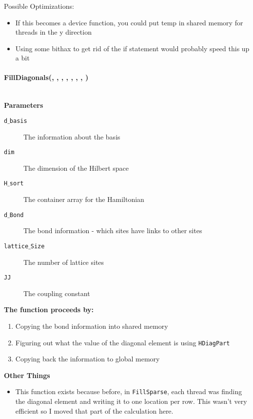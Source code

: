 \documentclass{article}
\begin{document}
Possible Optimizations:
\begin{itemize}
\item{If this becomes a device function, you could put temp in shared memory for threads in the y direction}
\item{Using some bithax to get rid of the if statement would probably speed this up a bit}
\end{itemize}

\paragraph{\cudaglobal \void FillDiagonals(\ptrint , \int , \ptrint , \ptrint , \hamstruct , \ptrint , \int , \double) \\ \\}
\noindent\textbf{Parameters}
\begin{description}
\item[\ptrint \texttt{d$\_$basis}] The information about the basis
\item[\int \texttt{dim}] The dimension of the Hilbert space
\item[\hamstruct \texttt{H$\_$sort}] The container array for the Hamiltonian
\item[\ptrint \texttt{d$\_$Bond}] The bond information - which sites have links to other sites
\item[\int \texttt{lattice$\_$Size}] The number of lattice sites
\item[\double \texttt{JJ}] The coupling constant
\end{description}

\textbf{The function proceeds by:}
\begin{enumerate}
\item{Copying the bond information into shared memory}
\item{Figuring out what the value of the diagonal element is using \texttt{HDiagPart}}
\item{Copying back the information to global memory}
\end{enumerate}

\textbf{Other Things}
\begin{itemize}
\item{This function exists because before, in \texttt{FillSparse}, each thread was finding the diagonal element and writing it to one location per row. This wasn't very efficient so I moved that part of the calculation here.}
\end{itemize}
\end{document}
